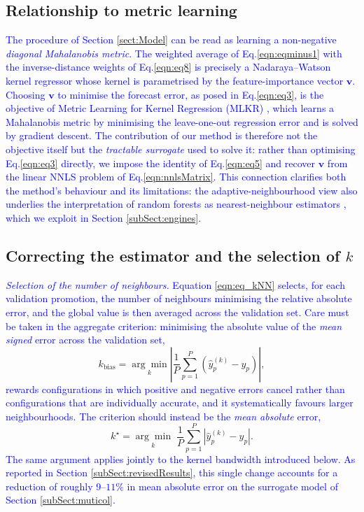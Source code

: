 \documentclass{ieeeaccess}
\newcommand{\myblue}[1]{\textcolor{blue}{#1}}
\begin{document}
\subsection{Relationship to metric learning} \label{subSect:metricLearning}

\myblue{The procedure of Section \ref{sect:Model} can be read as learning a
non-negative \emph{diagonal Mahalanobis metric}. The weighted average of
Eq.\eqref{eqn:eqminus1} with the inverse-distance weights of
Eq.\eqref{eqn:eq8} is precisely a Nadaraya--Watson kernel regressor whose kernel
is parametrised by the feature-importance vector $\mathbf{v}$. Choosing
$\mathbf{v}$ to minimise the forecast error, as posed in Eq.\eqref{eqn:eq3}, is
the objective of Metric Learning for Kernel Regression (MLKR)
\cite{weinberger2007metric}, which learns a Mahalanobis metric by minimising the
leave-one-out regression error and is solved by gradient descent. The
contribution of our method is therefore not the objective itself but the
\emph{tractable surrogate} used to solve it: rather than optimising
Eq.\eqref{eqn:eq3} directly, we impose the identity of Eq.\eqref{eqn:eq5} and
recover $\mathbf{v}$ from the linear NNLS problem of Eq.\eqref{eqn:nnlsMatrix}.
This connection clarifies both the method's behaviour and its limitations: the
adaptive-neighbourhood view also underlies the interpretation of random forests
as nearest-neighbour estimators \cite{lin2006random}, which we exploit in
Section \ref{subSect:engines}.}

\subsection{Correcting the estimator and the selection of $k$} \label{subSect:corrections}

\myblue{\emph{Selection of the number of neighbours.} Equation
\eqref{eqn:eq_kNN} selects, for each validation promotion, the number of
neighbours minimising the relative absolute error, and the global value is then
averaged across the validation set. Care must be taken in the aggregate
criterion: minimising the absolute value of the \emph{mean signed} error across
the validation set,}
\begin{equation}
k_\mathrm{bias} = \underset{k}{\arg\min} \left| \frac{1}{P}\sum_{p=1}^{P} \left( \hat{y}_p^{(k)} - y_p \right) \right|,
\label{eqn:kSelBias}
\end{equation}
\myblue{rewards configurations in which positive and negative errors cancel
rather than configurations that are individually accurate, and it
systematically favours larger neighbourhoods. The criterion should instead be
the \emph{mean absolute} error,}
\begin{equation}
k^\star = \underset{k}{\arg\min} \; \frac{1}{P}\sum_{p=1}^{P} \left| \hat{y}_p^{(k)} - y_p \right|.
\label{eqn:kSelCorrect}
\end{equation}
\myblue{The same argument applies jointly to the kernel bandwidth introduced
below. As reported in Section \ref{subSect:revisedResults}, this single change
accounts for a reduction of roughly $9$--$11\%$ in mean absolute error on the
surrogate model of Section \ref{subSect:muticol}.}
\end{document}

